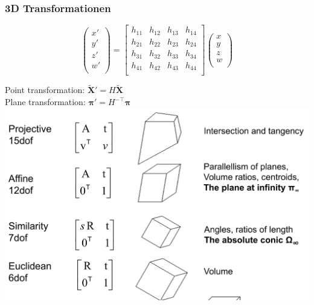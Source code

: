\subsubsection{3D Transformationen}

$$\begin{pmatrix}
x'\\
y'\\
z'\\
w'\\
\end{pmatrix} = \begin{bmatrix}
h_{11}&h_{12}&h_{13}&h_{14}\\
h_{21}&h_{22}&h_{23}&h_{24}\\
h_{31}&h_{32}&h_{33}&h_{34}\\
h_{41}&h_{42}&h_{43}&h_{44}\\
\end{bmatrix} \begin{pmatrix}
x\\
y\\
z\\
w\\
\end{pmatrix} $$

Point transformation: $\bm{\tilde{X}'} = H \bm{\tilde{X}}$\\
Plane transformation: $\bm{\pi'} = H^{-\top} \bm{\pi}$\\

\includegraphics[width=\columnwidth]{pictures/3Dtransformation}


